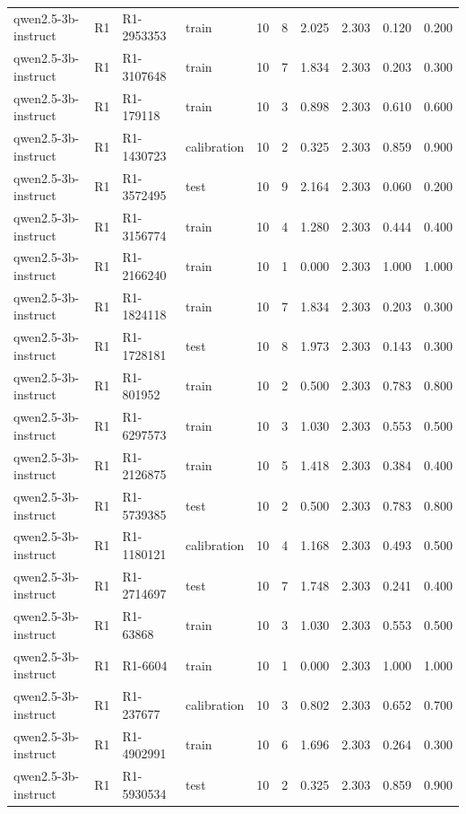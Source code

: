 \begin{table}
\begin{tabular}{llllrrrrrr}
qwen2.5-3b-instruct & R1 & R1-2953353 & train & 10 & 8 & 2.025 & 2.303 & 0.120 & 0.200 \\
qwen2.5-3b-instruct & R1 & R1-3107648 & train & 10 & 7 & 1.834 & 2.303 & 0.203 & 0.300 \\
qwen2.5-3b-instruct & R1 & R1-179118 & train & 10 & 3 & 0.898 & 2.303 & 0.610 & 0.600 \\
qwen2.5-3b-instruct & R1 & R1-1430723 & calibration & 10 & 2 & 0.325 & 2.303 & 0.859 & 0.900 \\
qwen2.5-3b-instruct & R1 & R1-3572495 & test & 10 & 9 & 2.164 & 2.303 & 0.060 & 0.200 \\
qwen2.5-3b-instruct & R1 & R1-3156774 & train & 10 & 4 & 1.280 & 2.303 & 0.444 & 0.400 \\
qwen2.5-3b-instruct & R1 & R1-2166240 & train & 10 & 1 & 0.000 & 2.303 & 1.000 & 1.000 \\
qwen2.5-3b-instruct & R1 & R1-1824118 & train & 10 & 7 & 1.834 & 2.303 & 0.203 & 0.300 \\
qwen2.5-3b-instruct & R1 & R1-1728181 & test & 10 & 8 & 1.973 & 2.303 & 0.143 & 0.300 \\
qwen2.5-3b-instruct & R1 & R1-801952 & train & 10 & 2 & 0.500 & 2.303 & 0.783 & 0.800 \\
qwen2.5-3b-instruct & R1 & R1-6297573 & train & 10 & 3 & 1.030 & 2.303 & 0.553 & 0.500 \\
qwen2.5-3b-instruct & R1 & R1-2126875 & train & 10 & 5 & 1.418 & 2.303 & 0.384 & 0.400 \\
qwen2.5-3b-instruct & R1 & R1-5739385 & test & 10 & 2 & 0.500 & 2.303 & 0.783 & 0.800 \\
qwen2.5-3b-instruct & R1 & R1-1180121 & calibration & 10 & 4 & 1.168 & 2.303 & 0.493 & 0.500 \\
qwen2.5-3b-instruct & R1 & R1-2714697 & test & 10 & 7 & 1.748 & 2.303 & 0.241 & 0.400 \\
qwen2.5-3b-instruct & R1 & R1-63868 & train & 10 & 3 & 1.030 & 2.303 & 0.553 & 0.500 \\
qwen2.5-3b-instruct & R1 & R1-6604 & train & 10 & 1 & 0.000 & 2.303 & 1.000 & 1.000 \\
qwen2.5-3b-instruct & R1 & R1-237677 & calibration & 10 & 3 & 0.802 & 2.303 & 0.652 & 0.700 \\
qwen2.5-3b-instruct & R1 & R1-4902991 & train & 10 & 6 & 1.696 & 2.303 & 0.264 & 0.300 \\
qwen2.5-3b-instruct & R1 & R1-5930534 & test & 10 & 2 & 0.325 & 2.303 & 0.859 & 0.900 \\

\end{tabular}
\end{table}
